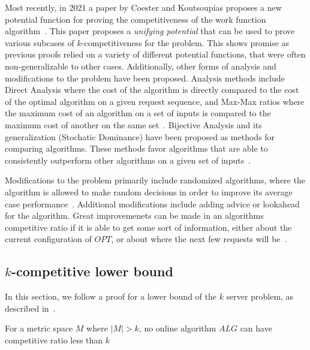 Most recently, in 2021 a paper by Coester and Koutsoupias proposes a new potential function for proving the competitiveness of the work function algorithm~\cite{unifyingPotential2021}. This paper proposes a \textit{unifying potential} that can be used to prove various subcases of $k$-competitiveness for the \KS problem. This shows promise as previous proofs relied on a variety of different potential functions, that were often non-generalizable to other cases.
Additionally, other forms of analysis and modifications to the \KS problem have been proposed. Analysis methods include Direct Analysis where the cost of the algorithm is directly compared to the cost of the optimal algorithm on a given request sequence, and Max-Max ratios where the maximum cost of an algorithm on a set of inputs is compared to the maximum cost of another on the same set~\cite{MAXMAX2005}. Bijective Analysis and its generalization (Stochatic Dominance) have been proposed as methods for comparing algorithms. These methods favor algorithms that are able to consistently outperform other algorithms on a given set of inputs~\cite{bij2016}. 

Modifications to the \KS problem primarily include randomized algorithms, where the algorithm is allowed to make random decisions in order to improve its average case performance~\cite{OnlineComp1998}. Additional modifications include adding advice or lookahead for the algorithm. Great improvemenets can be made in an algorithms competitive ratio if it is able to get some sort of information, either about the current configuration of $OPT$, or about where the next few requests will be~\cite{advice2015}.

\subsection{$k$-competitive lower bound}
\label{sec:lowerBound}

In this section, we follow a proof for a lower bound of the $k$ server problem, as described in~\cite{server2009}.

\begin{lemma}
    For a metric space $M$ where $|M| > k$, no online algorithm $ALG$ can have competitive ratio less than $k$
\end{lemma}

